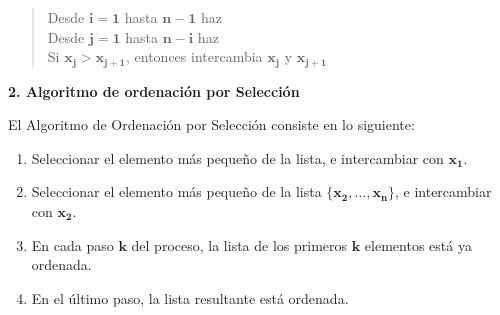 \documentclass[twoside]{report}
\newcommand{\bs}[1]{\boldsymbol{#1}}
\begin{document}
\vspace*{0.5cm}

    \begin{quotation}
        \hspace*{0cm} \textsf{Desde} $\bs{i=1}$ \textsf{hasta} $\bs{n-1}$ \textsf{haz} \\[1ex]
        \hspace*{0.8cm} \textsf{Desde} $\bs{j=1}$ \textsf{hasta} $\bs{n-i}$ \textsf{haz} \\[1ex]
        \hspace*{1.2cm} \textsf{Si} $\bs{x_j>x_{j+1}}$, \textsf{entonces} intercambia $\bs{x_j}$ y $\bs{x_{j+1}}$ \\[1ex]
    \end{quotation}


\textbf{2. Algoritmo de ordenación por Selección}

\vspace{0.5cm}
El Algoritmo de Ordenación por Selección consiste en lo siguiente:

        \begin{enumerate}
            \item Seleccionar el elemento más pequeño de la lista, e intercambiar con $\bs{x_1}$.
            \item Seleccionar el elemento más pequeño de la lista $\bs{\{x_2,\ldots,x_n\}}$, e intercambiar con $\bs{x_2}$.
            \item En cada paso $\bs{k}$ del proceso, la lista de los primeros $\bs{k}$ elementos está ya ordenada.
            \item En el último paso, la lista resultante está ordenada.
        \end{enumerate}
\end{document}
